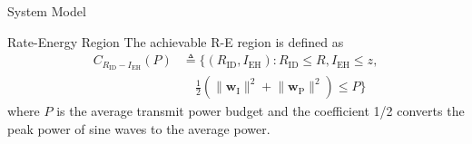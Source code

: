 \documentclass[journal]{IEEEtran}
\begin{document}
\begin{section}{System Model}
		\begin{subsection}{Rate-Energy Region}
			The achievable R-E region is defined as
			\begin{align}
				C_{R_{\mathrm{ID}}-I_{\mathrm{EH}}}(P)
				&\triangleq \biggl\{(R_{\mathrm{ID}}, I_{\mathrm{EH}}): R_{\mathrm{ID}} \le R, I_{\mathrm{EH}} \le z,\nonumber\\
				&\quad \frac{1}{2}\left(\lVert{\boldsymbol{w}_{\mathrm{I}}}\rVert^2+\lVert{\boldsymbol{w}_{\mathrm{P}}}\rVert^2\right) \le P\biggr\}
			\end{align}
			where $P$ is the average transmit power budget and the coefficient \num{1/2} converts the peak power of sine waves to the average power.
		\end{subsection}
	\end{section}
\end{document}
